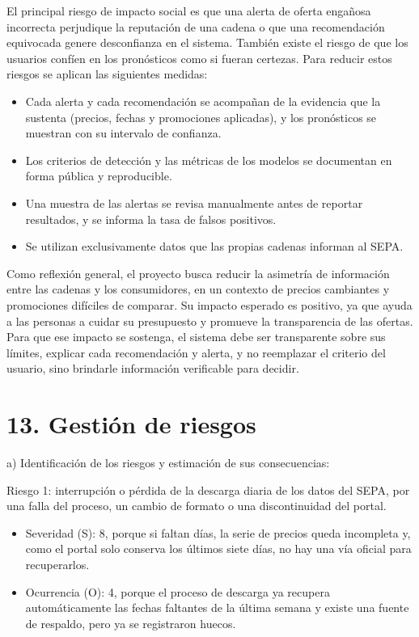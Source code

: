 \documentclass[
11pt, %
]{charter}
\begin{document}
El principal riesgo de impacto social es que una alerta de oferta engañosa incorrecta perjudique la reputación de una cadena o que una recomendación equivocada genere desconfianza en el sistema. También existe el riesgo de que los usuarios confíen en los pronósticos como si fueran certezas. Para reducir estos riesgos se aplican las siguientes medidas:

\begin{itemize}
	\item Cada alerta y cada recomendación se acompañan de la evidencia que la sustenta (precios, fechas y promociones aplicadas), y los pronósticos se muestran con su intervalo de confianza.
	\item Los criterios de detección y las métricas de los modelos se documentan en forma pública y reproducible.
	\item Una muestra de las alertas se revisa manualmente antes de reportar resultados, y se informa la tasa de falsos positivos.
	\item Se utilizan exclusivamente datos que las propias cadenas informan al SEPA.
\end{itemize}

Como reflexión general, el proyecto busca reducir la asimetría de información entre las cadenas y los consumidores, en un contexto de precios cambiantes y promociones difíciles de comparar. Su impacto esperado es positivo, ya que ayuda a las personas a cuidar su presupuesto y promueve la transparencia de las ofertas. Para que ese impacto se sostenga, el sistema debe ser transparente sobre sus límites, explicar cada recomendación y alerta, y no reemplazar el criterio del usuario, sino brindarle información verificable para decidir.


\section{13. Gestión de riesgos}
\label{sec:riesgos}

a) Identificación de los riesgos y estimación de sus consecuencias:

Riesgo 1: interrupción o pérdida de la descarga diaria de los datos del SEPA, por una falla del proceso, un cambio de formato o una discontinuidad del portal.
\begin{itemize}
	\item Severidad (S): 8, porque si faltan días, la serie de precios queda incompleta y, como el portal solo conserva los últimos siete días, no hay una vía oficial para recuperarlos.
	\item Ocurrencia (O): 4, porque el proceso de descarga ya recupera automáticamente las fechas faltantes de la última semana y existe una fuente de respaldo, pero ya se registraron huecos.
\end{itemize}
\end{document}
